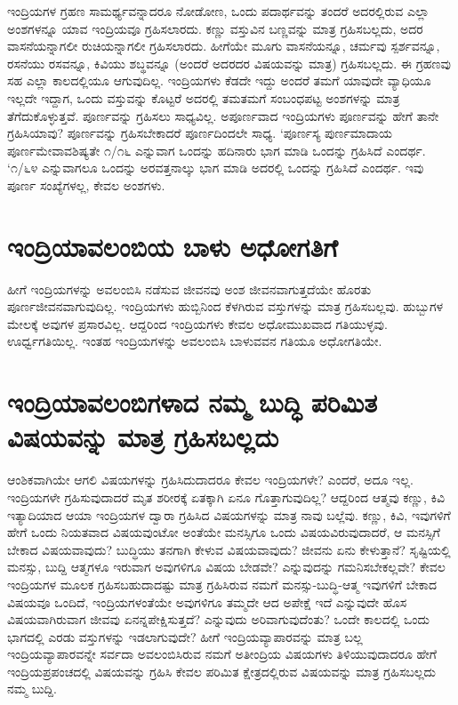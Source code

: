 ಇಂದ್ರಿಯಗಳ ಗ್ರಹಣ ಸಾಮರ್ಥ್ಯವನ್ನಾದರೂ ನೋಡೋಣ, ಒಂದು ಪದಾರ್ಥವನ್ನು ತಂದರೆ ಅದರಲ್ಲಿರುವ ಎಲ್ಲಾ ಅಂಶಗಳನ್ನೂ ಯಾವ ಇಂದ್ರಿಯವೂ ಗ್ರಹಿಸಲಾರದು. ಕಣ್ಣು ವಸ್ತುವಿನ ಬಣ್ಣವನ್ನು ಮಾತ್ರ ಗ್ರಹಿಸಬಲ್ಲದು, ಅದರ ವಾಸನೆಯನ್ನಾಗಲೀ ರುಚಿಯನ್ನಾಗಲೀ ಗ್ರಹಿಸಲಾರದು. ಹೀಗೆಯೇ ಮೂಗು ವಾಸನೆಯನ್ನೂ, ಚರ್ಮವು ಸ್ಪರ್ಶವನ್ನೂ, ರಸನೆಯು ರಸವನ್ನೂ, ಕಿವಿಯು ಶಬ್ಥವನ್ನೂ (ಅಂದರೆ ಅದರದರ ವಿಷಯವನ್ನು ಮಾತ್ರ) ಗ್ರಹಿಸಬಲ್ಲದು. ಈ ಗ್ರಹಣವು ಸಹ ಎಲ್ಲಾ ಕಾಲದಲ್ಲಿಯೂ ಆಗುವುದಿಲ್ಲ. ಇಂದ್ರಿಯಗಳು ಕೆಡದೇ ಇದ್ದು ಅಂದರೆ ತಮಗೆ ಯಾವುದೇ ವ್ಯಾಧಿಯೂ ಇಲ್ಲದೇ ಇದ್ದಾಗ, ಒಂದು ವಸ್ತುವನ್ನು ಕೊಟ್ಟರೆ ಅದರಲ್ಲಿ ತಮತಮಗೆ ಸಂಬಂಧಪಟ್ಟ ಅಂಶಗಳನ್ನು ಮಾತ್ರ ತೆಗೆದುಕೊಳ್ಳುತ್ತವೆ. ಪೂರ್ಣವನ್ನು ಗ್ರಹಿಸಲು ಸಾಧ್ಯವಿಲ್ಲ. ಅಪೂರ್ಣವಾದ ಇಂದ್ರಿಯಗಳು ಪೂರ್ಣವನ್ನು ಹೇಗೆ ತಾನೇ ಗ್ರಹಿಸಿಯಾವು? ಪೂರ್ಣವನ್ನು ಗ್ರಹಿಸಬೇಕಾದರೆ ಪೂರ್ಣದಿಂದಲೇ ಸಾಧ್ಯ. `ಪೂರ್ಣಸ್ಯ ಪುರ್ಣಮಾದಾಯ ಪೂರ್ಣಮೇವಾವಶಿಷ್ಯತೇ ೧/೧೬ ಎನ್ನುವಾಗ ಒಂದನ್ನು ಹದಿನಾರು ಭಾಗ ಮಾಡಿ ಒಂದನ್ನು ಗ್ರಹಿಸಿದೆ ಎಂದರ್ಥ. `೧/೬೪ ಎನ್ನುವಾಗಲೂ ಒಂದನ್ನು ಅರವತ್ತನಾಲ್ಕು ಭಾಗ ಮಾಡಿ ಅದರಲ್ಲಿ ಒಂದನ್ನು ಗ್ರಹಿಸಿದೆ ಎಂದರ್ಥ. ಇವು ಪೂರ್ಣ ಸಂಖ್ಯೆಗಳಲ್ಲ, ಕೇವಲ ಅಂಶಗಳು.

\section*{ಇಂದ್ರಿಯಾವಲಂಬಿಯ ಬಾಳು ಅಧೋಗತಿಗೆ}

ಹೀಗೆ ಇಂದ್ರಿಯಗಳನ್ನು ಅವಲಂಬಿಸಿ ನಡೆಸುವ ಜೀವನವು ಅಂಶ ಜೀವನವಾಗುತ್ತದೆಯೇ ಹೊರತು ಪೂರ್ಣಜೀವನವಾಗುವುದಿಲ್ಲ. ಇಂದ್ರಿಯಗಳು ಹುಬ್ಬಿನಿಂದ ಕೆಳಗಿರುವ ವಸ್ತುಗಳನ್ನು ಮಾತ್ರ ಗ್ರಹಿಸಬಲ್ಲವು. ಹುಬ್ಬುಗಳ ಮೇಲಕ್ಕೆ ಅವುಗಳ ಪ್ರಸಾರವಿಲ್ಲ. ಆದ್ದರಿಂದ ಇಂದ್ರಿಯಗಳು ಕೇವಲ ಅಧೋಮುಖವಾದ ಗತಿಯುಳ್ಳವು. ಊರ್ಧ್ವಗತಿಯಿಲ್ಲ. ಇಂತಹ ಇಂದ್ರಿಯಗಳನ್ನು ಅವಲಂಬಿಸಿ ಬಾಳುವವನ ಗತಿಯೂ ಅಧೋಗತಿಯೇ.

\section*{ಇಂದ್ರಿಯಾವಲಂಬಿಗಳಾದ ನಮ್ಮ ಬುದ್ಧಿ ಪರಿಮಿತ ವಿಷಯವನ್ನು ಮಾತ್ರ ಗ್ರಹಿಸಬಲ್ಲದು}

ಆಂಶಿಕವಾಗಿಯೇ ಆಗಲಿ ವಿಷಯಗಳನ್ನು ಗ್ರಹಿಸಿದುದಾದರೂ ಕೇವಲ ಇಂದ್ರಿಯಗಳೇ? ಎಂದರೆ, ಅದೂ ಇಲ್ಲ. ಇಂದ್ರಿಯಗಳೇ ಗ್ರಹಿಸುವುದಾದರೆ ಮೃತ ಶರೀರಕ್ಕೆ ಏತಕ್ಕಾಗಿ ಏನೂ ಗೊತ್ತಾಗುವುದಿಲ್ಲ? ಆದ್ದರಿಂದ ಆತ್ಮವು ಕಣ್ಣು, ಕಿವಿ ಇತ್ಯಾದಿಯಾದ ಆಯಾ ಇಂದ್ರಿಯಗಳ ದ್ವಾರಾ ಗ್ರಹಿಸಿದ ವಿಷಯಗಳನ್ನು ಮಾತ್ರ ನಾವು ಬಲ್ಲೆವು. ಕಣ್ಣು, ಕಿವಿ, ಇವುಗಳಿಗೆ ಹೇಗೆ ಒಂದು ನಿಯತವಾದ ವಿಷಯವುಂಟೋ ಅಂತೆಯೇ ಮನಸ್ಸಿಗೂ ಒಂದು ವಿಷಯವಿರುವುದಾದರೆ, ಆ ಮನಸ್ಸಿಗೆ ಬೇಕಾದ ವಿಷಯವಾವುದು? ಬುದ್ಧಿಯು ತನಗಾಗಿ ಕೇಳುವ ವಿಷಯವಾವುದು? ಜೀವನು ಏನು ಕೇಳುತ್ತಾನೆ? ಸೃಷ್ಟಿಯಲ್ಲಿ ಮನಸ್ಸು, ಬುದ್ದಿ ಆತ್ಮಗಳೂ ಇರುವಾಗ ಅವುಗಳಿಗೂ ವಿಷಯ ಬೇಡವೇ? ಎನ್ನುವುದನ್ನು ಗಮನಿಸಬೇಕಲ್ಲವೇ? ಕೇವಲ ಇಂದ್ರಿಯಗಳ ಮೂಲಕ ಗ್ರಹಿಸಬಹುದಾದಷ್ಟು  ಮಾತ್ರ ಗ್ರಹಿಸಿರುವ ನಮಗೆ ಮನಸ್ಸು-ಬುದ್ಧಿ-ಆತ್ಮ ಇವುಗಳಿಗೆ ಬೇಕಾದ ವಿಷಯವೂ ಒಂದಿದೆ, ಇಂದ್ರಿಯಗಳಂತೆಯೇ ಅವುಗಳಿಗೂ ತಮ್ಮದೇ ಆದ ಅಪೇಕ್ಷೆ ಇದೆ ಎನ್ನುವುದೇ ಹೊಸ ವಿಷಯವಾಗಿರುವಾಗ ಜೀವವು ಏನನ್ನಪೇಕ್ಷಿಸುತ್ತದೆ? ಎನ್ನುವುದು ಅರಿವಾಗುವುದೆಂತು? ಒಂದೇ ಕಾಲದಲ್ಲಿ ಒಂದು ಭಾಗದಲ್ಲಿ ಎರಡು ವಸ್ತುಗಳನ್ನು ಇಡಲಾಗುವುದೇ? ಹೀಗೆ ಇಂದ್ರಿಯವ್ಯಾಪಾರವನ್ನು ಮಾತ್ರ ಬಲ್ಲ ಇಂದ್ರಿಯವ್ಯಾಪಾರವನ್ನೇ ಸರ್ವದಾ ಅವಲಂಬಿಸಿರುವ ನಮಗೆ ಅತೀಂದ್ರಿಯ ವಿಷಯಗಳು ತಿಳಿಯುವುದಾದರೂ ಹೇಗೆ ಇಂದ್ರಿಯಪ್ರಪಂಚದಲ್ಲಿ ವಿಷಯವನ್ನು ಗ್ರಹಿಸಿ ಕೇವಲ ಪರಿಮಿತ ಕ್ಷೇತ್ರದಲ್ಲಿರುವ ವಿಷಯವನ್ನು ಮಾತ್ರ ಗ್ರಹಿಸಬಲ್ಲದು ನಮ್ಮ ಬುದ್ದಿ.

